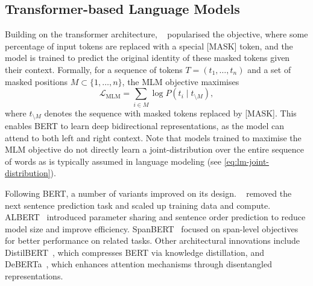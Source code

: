 
\subsection{Transformer-based Language Models}

Building on the transformer architecture, ~\citep{devlin2019bert} popularised the  objective, where some percentage of input tokens are replaced with a special [MASK] token, and the model is trained to predict the original identity of these masked tokens given their context. Formally, for a sequence of tokens $T = (t_1, \ldots, t_n)$ and a set of masked positions $M \subset \{1, \ldots, n\}$, the MLM objective maximises
\begin{equation}
    \mathcal{L}_{\text{MLM}} = \sum_{i \in M} \log P(t_i \mid t_{\setminus M}),
\end{equation}
where $t_{\setminus M}$ denotes the sequence with masked tokens replaced by [MASK]. This enables BERT to learn deep bidirectional representations, as the model can attend to both left and right context. Note that models trained to maximise the MLM objective do not directly learn a joint-distribution over the entire sequence of words as is typically assumed in language modeling (see \cref{eq:lm-joint-distribution}).

Following BERT, a number of variants improved on its design. ~\citep{liu2019roberta} removed the next sentence prediction task and scaled up training data and compute. ALBERT~\citep{lan2019albert} introduced parameter sharing and sentence order prediction to reduce model size and improve efficiency. SpanBERT~\citep{joshi2020spanbert} focused on span-level objectives for better performance on related tasks. Other architectural innovations include DistilBERT~\citep{sanh2019distilbert}, which compresses BERT via knowledge distillation, and DeBERTa~\citep{he2021deberta}, which enhances attention mechanisms through disentangled representations.

